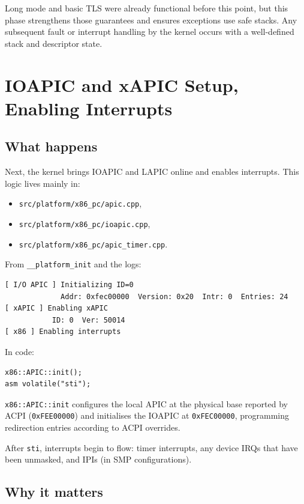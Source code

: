 \documentclass[a4paper,11pt]{article}
\begin{document}
Long mode and basic TLS were already functional before this point, but
this phase strengthens those guarantees and ensures exceptions use safe
stacks. Any subsequent fault or interrupt handling by the kernel occurs
with a well-defined stack and descriptor state.

\section{IOAPIC and xAPIC Setup, Enabling Interrupts}

\subsection{What happens}

Next, the kernel brings IOAPIC and LAPIC online and enables interrupts.
This logic lives mainly in:

\begin{itemize}
  \item \texttt{src/platform/x86\_pc/apic.cpp},
  \item \texttt{src/platform/x86\_pc/ioapic.cpp},
  \item \texttt{src/platform/x86\_pc/apic\_timer.cpp}.
\end{itemize}

From \texttt{\_\_platform\_init} and the logs:

\begin{verbatim}
[ I/O APIC ] Initializing ID=0
             Addr: 0xfec00000  Version: 0x20  Intr: 0  Entries: 24
[ xAPIC ] Enabling xAPIC
           ID: 0  Ver: 50014
[ x86 ] Enabling interrupts
\end{verbatim}

In code:

\begin{verbatim}
x86::APIC::init();
asm volatile("sti");
\end{verbatim}

\texttt{x86::APIC::init} configures the local APIC at the physical base
reported by ACPI (\texttt{0xFEE00000}) and initialises the IOAPIC at
\texttt{0xFEC00000}, programming redirection entries according to ACPI
overrides.

After \texttt{sti}, interrupts begin to flow: timer interrupts, any
device IRQs that have been unmasked, and IPIs (in SMP configurations).

\subsection{Why it matters}
\end{document}
